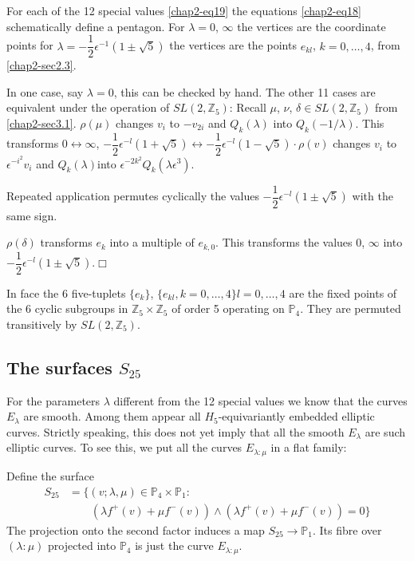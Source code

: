 \begin{proposition}\label{chap2-prop6}
For each of the 12 special values \eqref{chap2-eq19} the
equations \eqref{chap2-eq18} schematically define a pentagon. For
$\lambda=0$, $\infty$ the vertices are the coordinate points for
$\lambda=-\dfrac{1}{2}\epsilon^{-1}(1\pm \sqrt{5})$ the vertices are
the points $e_{kl}$, $k=0,\ldots,4$, from \ref{chap2-sec2.3}. 
\end{proposition}

In one case, say $\lambda=0$, this can be checked by hand. The other
11 cases are equivalent under the operation of $SL(2,\mathbb{Z}_{5})$:
Recall $\mu$, $\nu$, $\delta\in SL(2,\mathbb{Z}_{5})$
from \ref{chap2-sec3.1}. $\rho(\mu)$ changes $v_{i}$ to $-v_{2i}$ and
$Q_{k}(\lambda)$ into $Q_{k}(-1/\lambda)$. This transforms
$0\leftrightarrow \infty$, 
$-\dfrac{1}{2}\epsilon^{-l}(1+\sqrt{5})\leftrightarrow
-\dfrac{1}{2}\epsilon^{-l}(1-\sqrt{5})\cdot \rho(v)$ changes $v_{i}$
to $\epsilon^{-i^{2}}v_{i}$ and $Q_{k}(\lambda)$\pageoriginale into
$\epsilon^{-2k^{2}}Q_{k}(\lambda \epsilon^{3})$.

Repeated application permutes cyclically the values
$-\dfrac{1}{2}\epsilon^{-l}(1\pm \sqrt{5})$ with the same sign.

$\rho(\delta)$ transforms $e_{k}$ into a multiple of $e_{k,0}$. This
transforms the values $0$, $\infty$ into
$-\dfrac{1}{2}\epsilon^{-l}(1\pm \sqrt{5})$.\hfill$\Box$

In face the 6 five-tuplets $\{e_{k}\}$,
$\{e_{kl},k=0,\ldots,4\}l=0,\ldots,4$ are the fixed points of the 6
cyclic subgroups in $\mathbb{Z}_{5}\times \mathbb{Z}_{5}$ of order 5
operating on $\mathbb{P}_{4}$. They are permuted transitively by
$SL(2,\mathbb{Z}_{5})$. 

\subsection{The surfaces \texorpdfstring{$S_{25}$}{S25}}\label{chap2-sec3.4}

For the parameters $\lambda$ different from the 12 special values we
know that the curves $E_{\lambda}$ are smooth. Among them appear all
$H_{5}$-equivariantly embedded elliptic curves. Strictly speaking,
this does not yet imply that all the smooth $E_{\lambda}$ are such
elliptic curves. To see this, we put all the curves $E_{\lambda:\mu}$
in a flat family:

Define the surface
\begin{align*}
S_{25} &=\{(v;\lambda,\mu)\in\mathbb{P}_{4}\times \mathbb{P}_{1}:\\
&\qquad (\lambda f^{+}(v)+\mu f^{-}(v))\wedge (\lambda f^{+}(v)+\mu
f^{-}(v))=0\} 
\end{align*}
The projection onto the second factor induces a map
$S_{25}\to \mathbb{P}_{1}$. Its fibre over $(\lambda:\mu)$ projected
into $\mathbb{P}_{4}$ is just the curve $E_{\lambda:\mu}$. 

